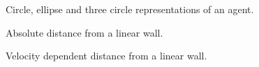\documentclass[]{article}
\begin{document}
\begin{multicols*}{2}

\end{multicols*}

\newpage



\begin{figure}[H]
\centering
\begin{tikzpicture}


\end{tikzpicture}
\caption{Circle, ellipse and three circle representations of an agent.}
\end{figure}

\newpage

\begin{multicols*}{2}

\end{multicols*}


\newpage


\begin{figure}[H]
\centering
\begin{tikzpicture}


\end{tikzpicture}
\caption{Absolute distance from a linear wall.}
\end{figure}

\begin{figure}[H]
\centering
\begin{tikzpicture}


\end{tikzpicture}
\caption{Velocity dependent distance from a linear wall.}
\end{figure}


\begin{multicols*}{2}

\end{multicols*}


\newpage


\begin{multicols*}{2}





\end{multicols*}

\end{document}
